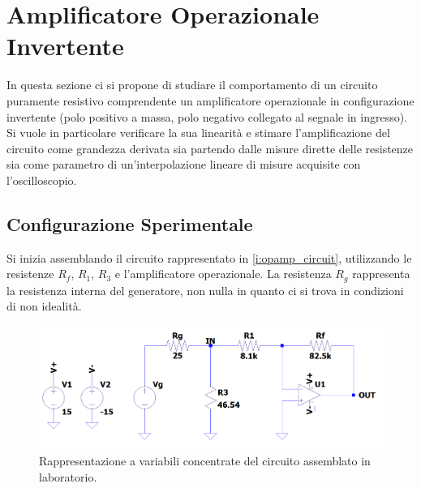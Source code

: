 \documentclass[a4paper,11pt]{article} %
\begin{document}
\cleardoublepage



\section{Amplificatore Operazionale Invertente}
In questa sezione ci si propone di studiare il comportamento di un circuito puramente resistivo comprendente un
amplificatore operazionale in configurazione invertente (polo positivo a massa, polo negativo collegato al segnale in
ingresso). Si vuole in particolare verificare la sua linearità e stimare l'amplificazione del circuito come grandezza
derivata sia partendo dalle misure dirette delle resistenze sia come parametro di un'interpolazione lineare di misure
acquisite con l'oscilloscopio. 



\subsection{Configurazione Sperimentale}

Si inizia assemblando il circuito rappresentato in  \autoref{i:opamp_circuit}, utilizzando le resistenze $R_f$, $R_1$,
$R_3$ e l'amplificatore operazionale. La resistenza $R_g$ rappresenta la resistenza interna del generatore, non nulla in
quanto ci si trova in condizioni di non idealità. 

\begin{figure}[H]
	\centering
	\includegraphics[width=15cm]{../Simulations/OpAmp/circuit_image_nosim.png}
	\caption{Rappresentazione a variabili concentrate del circuito assemblato in laboratorio.}
	\label{i:opamp_circuit}
\end{figure}
\end{document}
